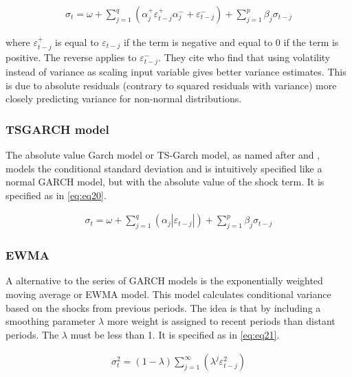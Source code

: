 \documentclass[a4paper, twoside]{templates/ociamthesis}
\begin{document}
\begin{align}
\sigma_t = \omega + \sum\limits_{j=1}^q (\alpha_j^+ \varepsilon_{t-j}^+ \alpha_j^{-} + \varepsilon_{t-j}^{-}) + \sum\limits_{j = 1}^p \beta_j \sigma_{t-j}
 \label{eq:eq19}
\end{align}

\noindent where \(\varepsilon_{t-j}^+\) is equal to \(\varepsilon_{t-j}\) if the term is negative and equal to 0 if the term is positive. The reverse applies to \(\varepsilon_{t-j}^-\). They cite \textcite{davidian1987} who find that using volatility instead of variance as scaling input variable gives better variance estimates. This is due to absolute residuals (contrary to squared residuals with variance) more closely predicting variance for non-normal distributions.

\hypertarget{tsgarch-model}{%
\subsubsection{TSGARCH model}\label{tsgarch-model}}

\noindent The absolute value Garch model or TS-Garch model, as named after \textcite{taylor1986} and \textcite{schwert1989}, models the conditional standard deviation and is intuitively specified like a normal GARCH model, but with the absolute value of the shock term. It is specified as in \eqref{eq:eq20}.

\begin{align}
\sigma_t = \omega + \sum\limits_{j=1}^q (\alpha_j \left|\varepsilon_{t-j}\right|) +
\sum\limits_{j = 1}^p \beta_j \sigma_{t-j}
 \label{eq:eq20}
\end{align}

\newpage

\hypertarget{ewma}{%
\subsubsection{EWMA}\label{ewma}}

\noindent A alternative to the series of GARCH models is the exponentially weighted moving average or EWMA model. This model calculates conditional variance based on the shocks from previous periods. The idea is that by including a smoothing parameter \(\lambda\) more weight is assigned to recent periods than distant periods. The \(\lambda\) must be less than 1. It is specified as in \eqref{eq:eq21}.

\begin{align}
\sigma_t^2 = (1-\lambda) \sum\limits_{j=1}^\infty (\lambda^j \varepsilon_{t-j}^2)
 \label{eq:eq21}
\end{align}
\end{document}
